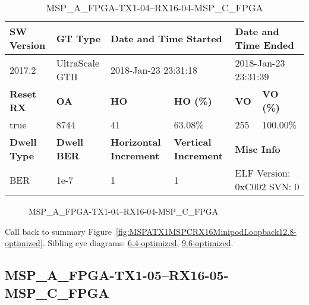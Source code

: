 \begin{table}[h]
\centering
\caption{MSP\_A\_FPGA-TX1-04--RX16-04-MSP\_C\_FPGA}
\label{tab:MSPAFPGATX104RX1604MSPCFPGA12.8-optimized}
\begin{tabular}{@{}|l|l|l|l|l|l|@{}}
\toprule
\textbf{SW Version}                & \textbf{GT Type}   & \multicolumn{2}{l|}{\textbf{Date and Time Started}}            & \multicolumn{2}{l|}{\textbf{Date and Time Ended}}        \\ \midrule
2017.2                       & UltraScale GTH          & \multicolumn{2}{l|}{2018-Jan-23 23:31:18}                   & \multicolumn{2}{l|}{2018-Jan-23 23:31:39}               \\ \midrule
\textbf{Reset RX}                  & \textbf{OA} & \textbf{HO}   & \textbf{HO (\%)} & \textbf{VO} & \textbf{VO (\%)} \\ \midrule
true & 8744        & 41          & 63.08\%        & 255        & 100.00\%       \\ \midrule
\textbf{Dwell Type}                & \textbf{Dwell BER} & \textbf{Horizontal Increment} & \textbf{Vertical Increment}    & \multicolumn{2}{l|}{\textbf{Misc Info}}                  \\ \midrule
BER                            & 1e-7        & 1        & 1           & \multicolumn{2}{l|}{ELF Version: 0xC002 SVN: 0}                         \\ \bottomrule
\end{tabular}
\end{table}

\begin{figure}[h]
\caption{MSP\_A\_FPGA-TX1-04--RX16-04-MSP\_C\_FPGA} \label{fig:MSPAFPGATX104RX1604MSPCFPGA12.8-optimized}
\end{figure}

Call back to summary Figure~\ref{fig:MSPATX1MSPCRX16MinipodLoopback12.8-optimized}.
Sibling eye diagrams: \hyperref[sec:MSPAFPGATX104RX1604MSPCFPGA6.4-optimized]{6.4-optimized}, \hyperref[sec:MSPAFPGATX104RX1604MSPCFPGA9.6-optimized]{9.6-optimized}.

\clearpage
\newpage


\subsection{MSP\_A\_FPGA-TX1-05--RX16-05-MSP\_C\_FPGA}\label{sec:MSPAFPGATX105RX1605MSPCFPGA12.8-optimized}

